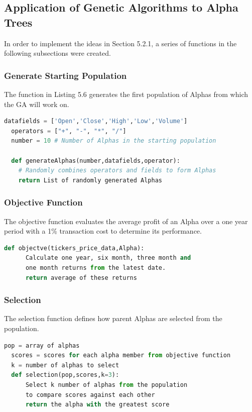 \documentclass[a4paper,12pt]{report}
\numberwithin{equation}{section}
\theoremstyle{definition}
\begin{document}
\subsection{Application of Genetic Algorithms to Alpha Trees}
In order to implement the ideas in Section 5.2.1, a series of functions in the following subsections were created.
\subsubsection{Generate Starting Population}
The function in Listing 5.6 generates the first population of Alphas from which the GA will work on.

\begin{lstlisting}[language=Python, caption=Generate Starting Alphas Pseudocode, basicstyle=\footnotesize\ttfamily]
  datafields = ['Open','Close','High','Low','Volume'] 
  operators = ["+", "-", "*", "/"]
  number = 10 # Number of Alphas in the starting population
  
  def generateAlphas(number,datafields,operator):
    # Randomly combines operators and fields to form Alphas
    return List of randomly generated Alphas 
  \end{lstlisting}


\subsubsection{Objective Function}
The objective function evaluates the average profit of an Alpha over a one year period with a 1\% transaction cost to determine its performance. 

\begin{lstlisting}[language=Python, caption=Objective Function Pseudocode, basicstyle=\footnotesize\ttfamily]
  def objectve(tickers_price_data,Alpha):
      Calculate one year, six month, three month and 
      one month returns from the latest date. 
      return average of these returns
  \end{lstlisting}

\subsubsection{Selection}
The selection function defines how parent Alphas are selected from the population. 
\begin{lstlisting}[language=Python, caption=Selection Function Pseudocode, basicstyle=\footnotesize\ttfamily]
  pop = array of alphas
  scores = scores for each alpha member from objective function
  k = number of alphas to select
  def selection(pop,scores,k=3):
      Select k number of alphas from the population 
      to compare scores against each other 
      return the alpha with the greatest score
\end{lstlisting}
\end{document}
